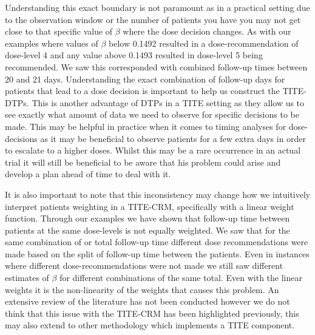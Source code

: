 Understanding this exact boundary is not paramount as in a practical setting due to the observation window or the number of patients you have you may not get close to that specific value of $\beta$ where the dose decision changes. As with our examples where values of $\beta$ below 0.1492 resulted in a dose-recommendation of dose-level 4 and any value above 0.1493 resulted in dose-level 5 being recommended. We saw this corresponded with combined follow-up times between 20 and 21 days. Understanding the exact combination of follow-up days for patients that lead to a dose decision is important to help us construct the TITE-DTPs. This is another advantage of DTPs in a TITE setting as they allow us to see exactly what amount of data we need to observe for specific decisions to be made. This may be helpful in practice when it comes to timing analyses for dose-decisions as it may be beneficial to observe patients for a few extra days in order to escalate to a higher doses. Whilst this may be a rare occurrence in an actual trial it will still be beneficial to be aware that his problem could arise and develop a plan ahead of time to deal with it. 

It is also important to note that this inconsistency may change how we intuitively interpret patients weighting in a TITE-CRM, specifically with a linear weight function. Through our examples we have shown that follow-up time between patients at the same dose-levels is not equally weighted. We saw that for the same combination of or total follow-up time different dose recommendations were made based on the split of follow-up time between the patients. Even in instances where different dose-recommendations were not made we still saw different estimates of $\beta$ for different combinations of the same total. Even with the linear weights it is the non-linearity of the weights that causes this problem. An extensive review of the literature has not been conducted however we do not think that this issue with the TITE-CRM has been highlighted previously, this may also extend to other methodology which implements a TITE component. 

